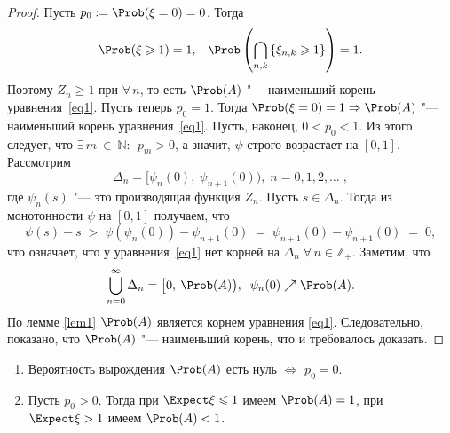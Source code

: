 \begin{proof}
  Пусть $p_{0} := \Prob(\xi = 0) = 0$. Тогда
  \begin{equation*}
    \Prob(\xi \geqslant 1) = 1{,}\quad \Prob\left(\bigcap_{n,k} \left\lbrace \xi_{n,k} \geqslant 1 \right\rbrace \right) = 1{.}
  \end{equation*}
  Поэтому $Z_{n} \geqslant 1$ при $\forall\, n$, то есть $\Prob(A)$ "--- наименьший корень уравнения~\eqref{eq1}.
  Пусть теперь $p_{0} = 1$. Тогда $\Prob(\xi = 0)=1 \Rightarrow \Prob(A)$ "--- наименьший корень уравнения~\eqref{eq1}.
  Пусть, наконец, $0 < p_{0} < 1$. Из этого следует, что $\exists\, m~\in~\mathbb{N}{:}\;\, p_{m} > 0$, а значит, $\psi$ строго возрастает на $[0, 1]$. Рассмотрим
  \begin{equation*}
    \Delta_{n} = \big[\psi_{n}(0),\: \psi_{n+1}\left(0\right)\big){,}\; n = 0, 1, 2, \ldots \; {,} %
  \end{equation*}
  где $\psi_{n}(s)$ "--- это производящая функция $Z_{n}$. Пусть $s \in \Delta_{n}$. Тогда из монотонности $\psi$ на $[0, 1]$ получаем, что
  \begin{equation*}
    \psi(s) - s \; > \; \psi(\psi_{n}(0)) - \psi_{n+1}(0) \; = \; \psi_{n+1}(0) - \psi_{n+1}(0) \; = \; 0{,}
  \end{equation*}
  что означает, что у уравнения~\eqref{eq1} нет корней на $\Delta_{n} \; \forall\, n \in \mathbb{Z_{+}}$.
  Заметим, что
  \begin{equation*}
    \bigcup_{n=0}^{\infty} \Delta_{n} = \big[0,\: \Prob(A)\big), \; \; \psi_{n}(0) \nearrow \Prob(A){.} %
  \end{equation*}
  По лемме \ref{lem1} $\Prob(A)$ является корнем уравнения \eqref{eq1}. Следовательно, показано, что $\Prob(A)$ "--- наименьший корень, что и требовалось доказать.
\end{proof}

\begin{thm} \mbox{}
 \begin{enumerate}
   \item\label{firth} Вероятность вырождения $\Prob(A)$ есть нуль $\Longleftrightarrow$ $p_{0} = 0$.
   \item\label{secth} Пусть $p_{0} > 0$. Тогда при $\Expect \xi \leqslant 1$ имеем $\Prob (A) = 1$, при $\Expect \xi > 1$ имеем $\Prob(A) < 1$.
 \end{enumerate}
\end{thm}

